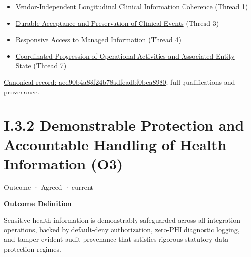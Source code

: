 \begin{itemize}


\item \href{\detokenize{../../../../../docs/markdown/01-motivation/goals-outcomes/strategic-goals.md}}{Vendor-Independent Longitudinal Clinical Information Coherence} (Thread 1)

\item \href{\detokenize{../../../../../docs/markdown/01-motivation/goals-outcomes/strategic-goals.md}}{Durable Acceptance and Preservation of Clinical Events} (Thread 3)

\item \href{\detokenize{../../../../../docs/markdown/01-motivation/goals-outcomes/strategic-goals.md}}{Responsive Access to Managed Information} (Thread 4)

\item \href{\detokenize{../../../../../docs/markdown/01-motivation/goals-outcomes/strategic-goals.md}}{Coordinated Progression of Operational Activities and Associated Entity State} (Thread 7)

\end{itemize}

{\footnotesize \href{../../../../continuum/motivation/outcome/aed90b4a88f24b78adfeadbf0bca8980.md}{Canonical record: aed90b4a88f24b78adfeadbf0bca8980}; full qualifications and provenance.}\par
\section*{I.3.2 Demonstrable Protection and Accountable Handling of Health Information (O3)}
\label{navigation:I.3.2}

\label{element:75519ed8f7de4a619cc9065f525d703a}
{\small Outcome · Agreed · current}\par

\par\medskip\textbf{Outcome Definition}\par


Sensitive health information is demonstrably safeguarded across all integration operations, backed by default-deny authorization, zero-PHI diagnostic logging, and tamper-evident audit provenance that satisfies rigorous statutory data protection regimes.



